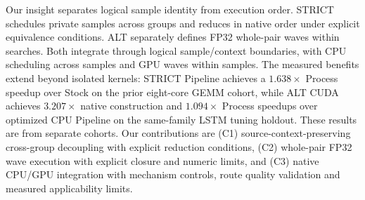 Our insight separates logical sample identity from execution order. STRICT schedules private samples across groups and reduces in native order under explicit equivalence conditions. ALT separately defines FP32 whole-pair waves within searches. Both integrate through logical sample/context boundaries, with CPU scheduling across samples and GPU waves within samples. The measured benefits extend beyond isolated kernels: STRICT Pipeline achieves a $1.638\times$ Process speedup over Stock on the prior eight-core GEMM cohort, while ALT CUDA achieves $3.207\times$ native construction and $1.094\times$ Process speedups over optimized CPU Pipeline on the same-family LSTM tuning holdout. These results are from separate cohorts. Our contributions are (C1) source-context-preserving cross-group decoupling with explicit reduction conditions, (C2) whole-pair FP32 wave execution with explicit closure and numeric limits, and (C3) native CPU/GPU integration with mechanism controls, route quality validation and measured applicability limits.
